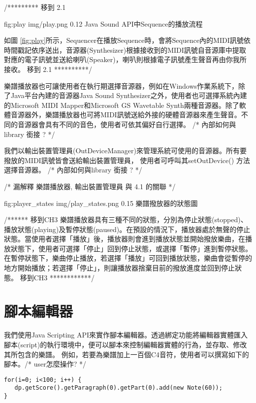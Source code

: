 \documentclass[12pt,a4paper,oneside]{report}
\begin{document}
/*********  移到 2.1 

\figurewithcaption
{fig:play}
{img/play.png}
{0.12}
{Java Sound API中Sequence的播放流程}

如圖 \ref{fig:play}所示，Sequencer在播放Sequence時，會將Sequence內的MIDI訊號依時間戳記依序送出，音源器(Synthesizer)根據接收到的MIDI訊號自音源庫中提取對應的電子訊號並送給喇叭(Speaker)，喇叭則根據電子訊號產生聲音再由你我所接收。
移到 2.1    **********/ 


樂譜播放器也可讓使用者在執行期選擇音源器，例如在Windows作業系統下，除了Java平台內建的音源器Java Sound Synthesizer之外，使用者也可選擇系統內建的Microsoft MIDI Mapper和Microsoft GS Wavetable Synth兩種音源器。除了軟體音源器外，樂譜播放器也可將MIDI訊號送給外接的硬體音源器來產生聲音。不同的音源器會具有不同的音色，使用者可依其偏好自行選擇。 /* 內部如何與library 銜接 ?  */

我們以輸出裝置管理員(OutDeviceManager)來管理系統可使用的音源器。所有要撥放的MIDI訊號皆會送給輸出裝置管理員， 使用者可呼叫其setOutDevice() 方法選擇音源器。 /* 內部如何與library 銜接 ?  */

/*  漏解釋 樂譜播放器, 輸出裝置管理員 與 4.1 的關聯  */


\figurewithcaption
{fig:player_states}
{img/play_states.png}
{0.15}
{樂譜撥放器的狀態圖}

/****** 移到CH3  
樂譜播放器具有三種不同的狀態，分別為停止狀態(stopped)、播放狀態(playing)及暫停狀態(paused)。在預設的情況下，播放器處於無聲的停止狀態。當使用者選擇「播放」後，播放器則會進到播放狀態並開始撥放樂曲，在播放狀態下，使用者可選擇「停止」回到停止狀態，或選擇「暫停」進到暫停狀態。在暫停狀態下，樂曲停止播放，若選擇「播放」可回到播放狀態，樂曲會從暫停的地方開始播放；若選擇「停止」，則讓播放器捨棄目前的撥放進度並回到停止狀態。
 移到CH3  ************/  


\section{腳本編輯器}

我們使用Java Scripting API來實作腳本編輯器。透過綁定功能將編輯器實體匯入腳本(script)的執行環境中，便可以腳本來控制編輯器實體的行為，並存取、修改其所包含的樂譜。
例如，若要為樂譜加上一百個C4音符，使用者可以撰寫如下的腳本。/* user怎麼操作? */

\begin{verbatim}
for(i=0; i<100; i++) { 
   dp.getScore().getParagraph(0).getPart(0).add(new Note(60));
}
\end{verbatim}
\end{document}
